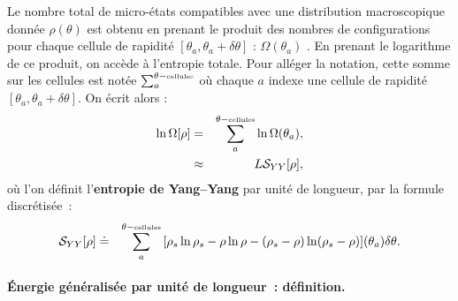 
Le nombre total de micro-états compatibles avec une distribution macroscopique donnée $\rho(\theta)$ est obtenu en prenant le produit des nombres de configurations pour chaque cellule de rapidité $[\theta_a, \theta_a + \delta \theta]$ : $ \Omega(\theta_a)$ .
En prenant le logarithme de ce produit, on accède à l'entropie totale. Pour alléger la notation, cette somme sur les cellules est notée
\(
	\sum_a^{\theta-\mbox{\tiny cellules}}	
\)
où chaque $a$ indexe une cellule de rapidité $[\theta_a, \theta_a + \delta\theta]$.
On écrit alors :
\begin{eqnarray}
    \ln \Omega[\rho] & = & \sum_a^{\theta-\mbox{\tiny cellules}} \ln \Omega(\theta_a), \\
    & \approx &   L\mathcal{S}_{YY} [ \rho ] , 	
\end{eqnarray}
où l’on définit l’\textbf{entropie de Yang–Yang} par unité de longueur,  par la formule discrétisée :
\begin{eqnarray}
    \mathcal{S}_{YY}[\rho] & \doteq & \sum_a^{\theta-\mbox{\tiny cellules}} \, [ \rho_s\ln \rho_s - \rho \ln \rho - ( \rho_s - \rho ) \ln ( \rho_s - \rho ) ] (\theta_a) \delta \theta .
\end{eqnarray}



\paragraph{Énergie généralisée par unité de longueur : définition.}

